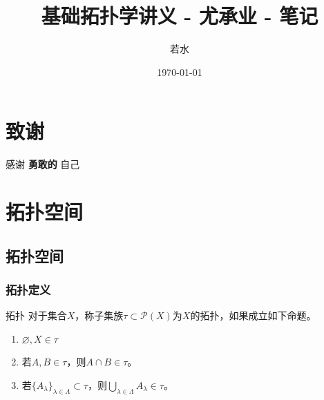 \documentclass[lang = cn, scheme = chinese, thmcnt = section, usesamecnt]{elegantbook}
\title{基础拓扑学讲义 - 尤承业 - 笔记}                %
\author{若水}                        %
\date{\today}                       %
\newcommand{\sub}{\subset}             %
\newcommand{\dis}{\displaystyle}
\begin{document}
\maketitle       %

\frontmatter     %

\chapter*{致谢}


\vspace*{\fill}
	\begin{center}
		
		\large{感谢 \textbf{ 勇敢的 } 自己}
		
	\end{center}
\vspace*{\fill}

\tableofcontents %

\mainmatter      %

\chapter{拓扑空间}

\section{拓扑空间}

\subsection{拓扑定义}

\begin{definition}{拓扑}
	对于集合$X$，称子集族$\tau\sub\mathscr{P}(X)$为$X$的拓扑，如果成立如下命题。
	\begin{enumerate}
		\item $\varnothing,X\in \tau$
		\item 若$A,B\in \tau$，则$A\cap B\in\tau$。
		\item 若$\{ A_\lambda \}_{\lambda\in\Lambda}\sub \tau$，则$\dis\bigcup_{\lambda\in\Lambda}A_\lambda\in\tau$。
	\end{enumerate}
\end{definition}
\end{document}
